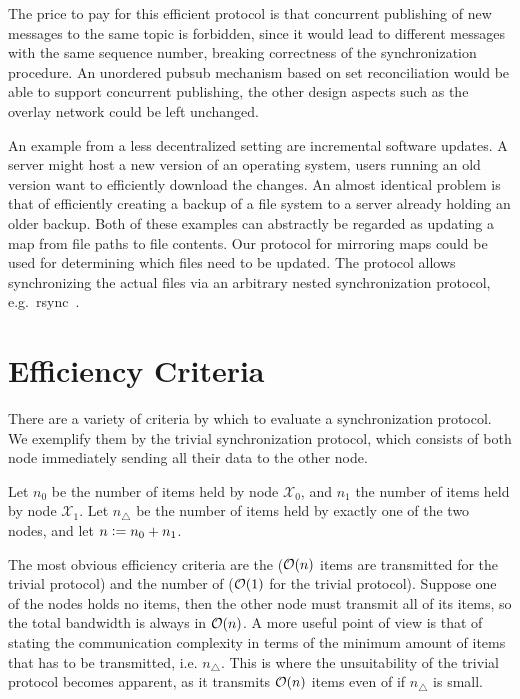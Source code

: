 The price to pay for this efficient protocol is that concurrent publishing of new
messages to the same topic is forbidden, since it would lead to
different messages with the same sequence number, breaking correctness
of the synchronization procedure. An unordered pubsub mechanism based on
set reconciliation would be able to support concurrent publishing, the
other design aspects such as the overlay network could be left
unchanged.

An example from a less decentralized setting are incremental software
updates. A server might host a new version of an operating system, users
running an old version want to efficiently download the changes. An
almost identical problem is that of efficiently creating a backup of a file
system to a server already holding an older backup. Both of these
examples can abstractly be regarded as updating a map from file paths to
file contents. Our protocol for mirroring maps could be used for
determining which files need to be updated. The protocol allows
synchronizing the actual files via an arbitrary nested synchronization
protocol, e.g.~rsync~\cite{tridgell1996rsync}.

\section{Efficiency Criteria}\label{efficiency-criteria}

There are a variety of criteria by which to evaluate a synchronization
protocol. We exemplify them by the trivial synchronization protocol,
which consists of both node immediately sending all their data to the
other node.

Let $n_0$ be the number of items held by node $\mathcal{X}_0$, and $n_1$ the number of items
held by node $\mathcal{X}_1$. Let $n_{\triangle}$ be the number of items held by exactly one of the two nodes, and let $n \vcentcolon= n_0 + n_1$.

The most obvious efficiency criteria are the 
($\mathcal{O}(n)$ items are transmitted for the trivial protocol) and the number of
 ($\mathcal{O}(1)$ for the trivial protocol). Suppose one of the nodes holds no items, then the other node must transmit all of its items, so the total bandwidth is always in $\mathcal{O}(n)$. A more useful point of view is that of stating the communication complexity in terms of the minimum amount of items that has to be transmitted, i.e. $n_{\triangle}$. This is where the unsuitability of the trivial protocol becomes apparent, as it transmits $\mathcal{O}(n)$ items even of if $n_{\triangle}$ is small.


